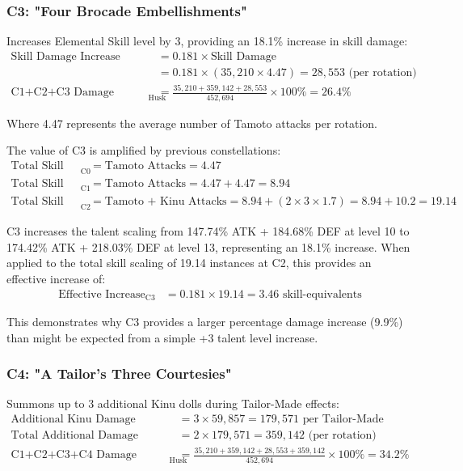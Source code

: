 \documentclass[12pt,a4paper]{article}
\begin{document}
\subsubsection{C3: "Four Brocade Embellishments"}
Increases Elemental Skill level by 3, providing an 18.1\% increase in skill damage:
\begin{align}
\text{Skill Damage Increase} &= 0.181 \times \text{Skill Damage} \\
&= 0.181 \times (35,210 \times 4.47) = 28,553 \text{ (per rotation)} \\
\text{C1+C2+C3 Damage Increase}_{\text{Husk}} &= \frac{35,210 + 359,142 + 28,553}{452,694} \times 100\% = 26.4\%
\end{align}

Where 4.47 represents the average number of Tamoto attacks per rotation.

The value of C3 is amplified by previous constellations:
\begin{align}
\text{Total Skill Scaling}_{\text{C0}} &= \text{Tamoto Attacks} = 4.47 \\
\text{Total Skill Scaling}_{\text{C1}} &= \text{Tamoto Attacks} = 4.47 + 4.47 = 8.94 \\
\text{Total Skill Scaling}_{\text{C2}} &= \text{Tamoto + Kinu Attacks} = 8.94 + (2 \times 3 \times 1.7) = 8.94 + 10.2 = 19.14
\end{align}

C3 increases the talent scaling from 147.74\% ATK + 184.68\% DEF at level 10 to 174.42\% ATK + 218.03\% DEF at level 13, representing an 18.1\% increase. When applied to the total skill scaling of 19.14 instances at C2, this provides an effective increase of:
\begin{align}
\text{Effective Increase}_{\text{C3}} &= 0.181 \times 19.14 = 3.46 \text{ skill-equivalents}
\end{align}

This demonstrates why C3 provides a larger percentage damage increase (9.9\%) than might be expected from a simple +3 talent level increase.

\subsubsection{C4: "A Tailor's Three Courtesies"}
Summons up to 3 additional Kinu dolls during Tailor-Made effects:
\begin{align}
\text{Additional Kinu Damage} &= 3 \times 59,857 = 179,571 \text{ per Tailor-Made} \\
\text{Total Additional Damage} &= 2 \times 179,571 = 359,142 \text{ (per rotation)} \\
\text{C1+C2+C3+C4 Damage Increase}_{\text{Husk}} &= \frac{35,210 + 359,142 + 28,553 + 359,142}{452,694} \times 100\% = 34.2\%
\end{align}
\end{document}
